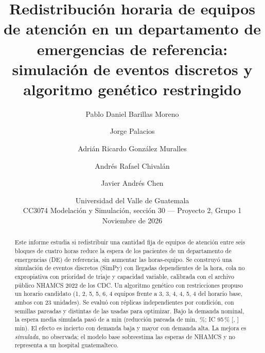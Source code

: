 \documentclass[11pt,a4paper]{article}
\title{Redistribución horaria de equipos de atención en un departamento de
emergencias de referencia:\\ simulación de eventos discretos y algoritmo genético restringido}
\author{Pablo Daniel Barillas Moreno \and Jorge Palacios \and
Adrián Ricardo González Muralles \and Andrés Rafael Chivalán \and
Javier Andrés Chen}
\date{Universidad del Valle de Guatemala\\
CC3074 Modelación y Simulación, sección 30 --- Proyecto 2, Grupo 1\\
Noviembre de 2026}
\begin{document}
\maketitle
\thispagestyle{empty}

\begin{abstract}
\noindent
Este informe estudia si redistribuir una cantidad fija de equipos de atención entre
seis bloques de cuatro horas reduce la espera de los pacientes de un departamento de
emergencias (DE) de referencia, sin aumentar las horas-equipo. Se construyó una
simulación de eventos discretos (SimPy) con llegadas dependientes de la hora, cola
no expropiativa con prioridad de triaje y capacidad variable, calibrada con el archivo
público NHAMCS 2022 de los CDC. Un algoritmo genético con restricciones propuso un
horario candidato (1, 2, 5, 5, 6, 4 equipos frente a 3, 3, 4, 4, 5, 4 del horario base,
ambos con 23 unidades).
Se evaluó con \NReps{} réplicas independientes por condición, con semillas pareadas
y distintas de las usadas para optimizar. Bajo la demanda nominal, la espera media
simulada pasó de \WaitBaseNom{} a \WaitCandNom{} min (reducción pareada de \RedNom{} min,
\RedPctNom\,\%; IC 95\,\% [\RedCILowNom, \RedCIHighNom] min). El efecto es incierto
con demanda baja y mayor con demanda alta. La mejora es \emph{simulada}, no observada;
el modelo base sobreestima las esperas de NHAMCS y no representa a un hospital
guatemalteco.
\end{abstract}

\newpage
\tableofcontents
\newpage


















\end{document}
